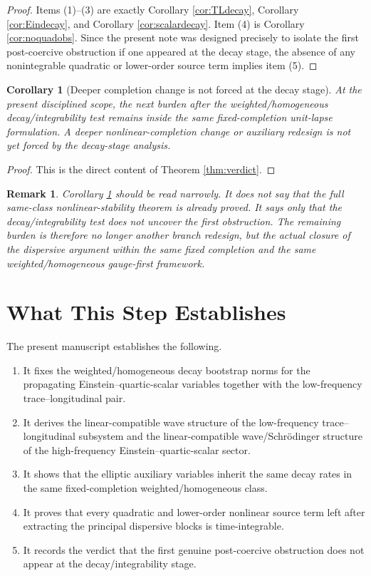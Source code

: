 \documentclass[11pt]{article}
\newtheorem{remark}{Remark}
\newtheorem{corollary}{Corollary}
\begin{document}
\begin{proof}
Items (1)--(3) are exactly Corollary \ref{cor:TLdecay}, Corollary \ref{cor:Eindecay}, and Corollary \ref{cor:scalardecay}. Item (4) is Corollary \ref{cor:noquadobs}. Since the present note was designed precisely to isolate the first post-coercive obstruction if one appeared at the decay stage, the absence of any nonintegrable quadratic or lower-order source term implies item (5).
\end{proof}

\begin{corollary}[Deeper completion change is not forced at the decay stage]
\label{cor:nodeeper}
At the present disciplined scope, the next burden after the weighted/homogeneous decay/integrability test remains inside the same fixed-completion unit-lapse formulation. A deeper nonlinear-completion change or auxiliary redesign is not yet forced by the decay-stage analysis.
\end{corollary}

\begin{proof}
This is the direct content of Theorem \ref{thm:verdict}.
\end{proof}

\begin{remark}
Corollary \ref{cor:nodeeper} should be read narrowly. It does not say that the full same-class nonlinear-stability theorem is already proved. It says only that the decay/integrability test does not uncover the first obstruction. The remaining burden is therefore no longer another branch redesign, but the actual closure of the dispersive argument within the same fixed completion and the same weighted/homogeneous gauge-first framework.
\end{remark}

\section{What This Step Establishes}

The present manuscript establishes the following.
\begin{enumerate}
    \item It fixes the weighted/homogeneous decay bootstrap norms for the propagating Einstein--quartic-scalar variables together with the low-frequency trace--longitudinal pair.
    \item It derives the linear-compatible wave structure of the low-frequency trace--longitudinal subsystem and the linear-compatible wave/Schr\"odinger structure of the high-frequency Einstein--quartic-scalar sector.
    \item It shows that the elliptic auxiliary variables inherit the same decay rates in the same fixed-completion weighted/homogeneous class.
    \item It proves that every quadratic and lower-order nonlinear source term left after extracting the principal dispersive blocks is time-integrable.
    \item It records the verdict that the first genuine post-coercive obstruction does not appear at the decay/integrability stage.
\end{enumerate}
\end{document}
